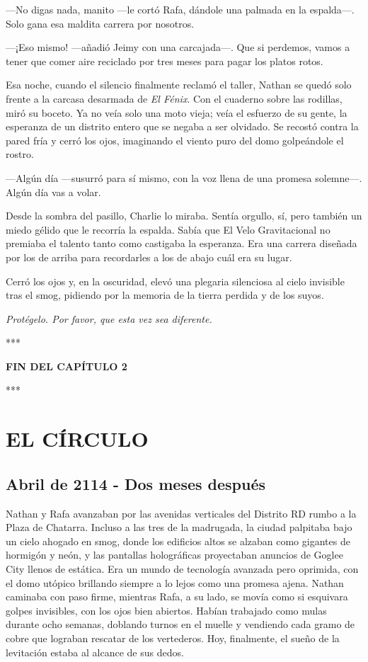 \documentclass[11pt,twoside]{book}
\begin{document}
---No digas nada, manito ---le cortó Rafa, dándole una palmada en la espalda---. Solo gana esa maldita carrera por nosotros.

---¡Eso mismo! ---añadió Jeimy con una carcajada---. Que si perdemos, vamos a tener que comer aire reciclado por tres meses para pagar los platos rotos.

Esa noche, cuando el silencio finalmente reclamó el taller, Nathan se quedó solo frente a la carcasa desarmada de \textit{El Fénix}. Con el cuaderno sobre las rodillas, miró su boceto. Ya no veía solo una moto vieja; veía el esfuerzo de su gente, la esperanza de un distrito entero que se negaba a ser olvidado. Se recostó contra la pared fría y cerró los ojos, imaginando el viento puro del domo golpeándole el rostro.

---Algún día ---susurró para sí mismo, con la voz llena de una promesa solemne---. Algún día vas a volar.

Desde la sombra del pasillo, Charlie lo miraba. Sentía orgullo, sí, pero también un miedo gélido que le recorría la espalda. Sabía que El Velo Gravitacional no premiaba el talento tanto como castigaba la esperanza. Era una carrera diseñada por los de arriba para recordarles a los de abajo cuál era su lugar.

Cerró los ojos y, en la oscuridad, elevó una plegaria silenciosa al cielo invisible tras el smog, pidiendo por la memoria de la tierra perdida y de los suyos.

\textit{Protégelo. Por favor, que esta vez sea diferente.}

\bigskip
\begin{center}***\end{center}
\bigskip

\textbf{FIN DEL CAPÍTULO 2}


\bigskip
\begin{center}***\end{center}
\bigskip

\chapter{EL CÍRCULO}

\section*{Abril de 2114 - Dos meses después}

Nathan y Rafa avanzaban por las avenidas verticales del Distrito RD rumbo a la Plaza de Chatarra. Incluso a las tres de la madrugada, la ciudad palpitaba bajo un cielo ahogado en smog, donde los edificios altos se alzaban como gigantes de hormigón y neón, y las pantallas holográficas proyectaban anuncios de Goglee City llenos de estática. Era un mundo de tecnología avanzada pero oprimida, con el domo utópico brillando siempre a lo lejos como una promesa ajena. Nathan caminaba con paso firme, mientras Rafa, a su lado, se movía como si esquivara golpes invisibles, con los ojos bien abiertos. Habían trabajado como mulas durante ocho semanas, doblando turnos en el muelle y vendiendo cada gramo de cobre que lograban rescatar de los vertederos. Hoy, finalmente, el sueño de la levitación estaba al alcance de sus dedos.
\end{document}
